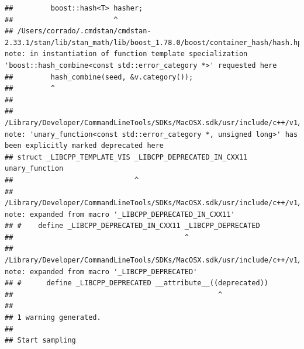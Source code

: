 \documentclass[
]{article}
\begin{document}
\begin{verbatim}
##         boost::hash<T> hasher;
##                        ^
## /Users/corrado/.cmdstan/cmdstan-2.33.1/stan/lib/stan_math/lib/boost_1.78.0/boost/container_hash/hash.hpp:551:9: note: in instantiation of function template specialization 'boost::hash_combine<const std::error_category *>' requested here
##         hash_combine(seed, &v.category());
##         ^
## 
## /Library/Developer/CommandLineTools/SDKs/MacOSX.sdk/usr/include/c++/v1/__functional/unary_function.h:23:29: note: 'unary_function<const std::error_category *, unsigned long>' has been explicitly marked deprecated here
## struct _LIBCPP_TEMPLATE_VIS _LIBCPP_DEPRECATED_IN_CXX11 unary_function
##                             ^
## /Library/Developer/CommandLineTools/SDKs/MacOSX.sdk/usr/include/c++/v1/__config:825:41: note: expanded from macro '_LIBCPP_DEPRECATED_IN_CXX11'
## #    define _LIBCPP_DEPRECATED_IN_CXX11 _LIBCPP_DEPRECATED
##                                         ^
## /Library/Developer/CommandLineTools/SDKs/MacOSX.sdk/usr/include/c++/v1/__config:810:49: note: expanded from macro '_LIBCPP_DEPRECATED'
## #      define _LIBCPP_DEPRECATED __attribute__((deprecated))
##                                                 ^
## 
## 1 warning generated.
## 
## Start sampling
\end{verbatim}
\end{document}

